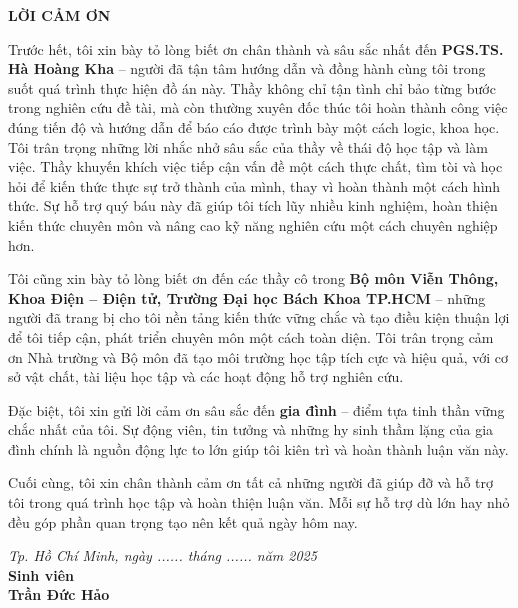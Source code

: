\thispagestyle{empty}
\begin{center}
    \vspace*{1.5cm}
    \textbf{\fontsize{16}{19}\selectfont LỜI CẢM ƠN}
    \vspace{0.8cm}
\end{center}

\noindent
\setlength{\parindent}{1.5cm}
\setlength{\parskip}{6pt}
\fontsize{12}{14}\selectfont  

Trước hết, tôi xin bày tỏ lòng biết ơn chân thành và sâu sắc nhất đến \textbf{PGS.TS. Hà Hoàng Kha} – người đã tận tâm hướng dẫn và đồng hành cùng tôi trong suốt quá trình thực hiện đồ án này. Thầy không chỉ tận tình chỉ bảo từng bước trong nghiên cứu đề tài, mà còn thường xuyên đốc thúc tôi hoàn thành công việc đúng tiến độ và hướng dẫn để báo cáo được trình bày một cách logic, khoa học. Tôi trân trọng những lời nhắc nhở sâu sắc của thầy về thái độ học tập và làm việc. Thầy khuyến khích việc tiếp cận vấn đề một cách thực chất, tìm tòi và học hỏi để kiến thức thực sự trở thành của mình, thay vì hoàn thành một cách hình thức. Sự hỗ trợ quý báu này đã giúp tôi tích lũy nhiều kinh nghiệm, hoàn thiện kiến thức chuyên môn và nâng cao kỹ năng nghiên cứu một cách chuyên nghiệp hơn.

Tôi cũng xin bày tỏ lòng biết ơn đến các thầy cô trong \textbf{Bộ môn Viễn Thông, Khoa Điện – Điện tử, Trường Đại học Bách Khoa TP.HCM} – những người đã trang bị cho tôi nền tảng kiến thức vững chắc và tạo điều kiện thuận lợi để tôi tiếp cận, phát triển chuyên môn một cách toàn diện. Tôi trân trọng cảm ơn Nhà trường và Bộ môn đã tạo môi trường học tập tích cực và hiệu quả, với cơ sở vật chất, tài liệu học tập và các hoạt động hỗ trợ nghiên cứu.

Đặc biệt, tôi xin gửi lời cảm ơn sâu sắc đến \textbf{gia đình} – điểm tựa tinh thần vững chắc nhất của tôi. Sự động viên, tin tưởng và những hy sinh thầm lặng của gia đình chính là nguồn động lực to lớn giúp tôi kiên trì và hoàn thành luận văn này.

Cuối cùng, tôi xin chân thành cảm ơn tất cả những người đã giúp đỡ và hỗ trợ tôi trong quá trình học tập và hoàn thiện luận văn. Mỗi sự hỗ trợ dù lớn hay nhỏ đều góp phần quan trọng tạo nên kết quả ngày hôm nay.

\vspace{0.8cm}
\begin{flushright}
    \begin{minipage}{0.5\textwidth}
        \centering
        \textit{Tp. Hồ Chí Minh, ngày ...... tháng ...... năm 2025} \\
        \vspace{0.8cm}
        \textbf{Sinh viên} \\
        \vspace{0.3cm}
        \textbf{Trần Đức Hảo}
    \end{minipage}
\end{flushright}

\vfill
\clearpage
